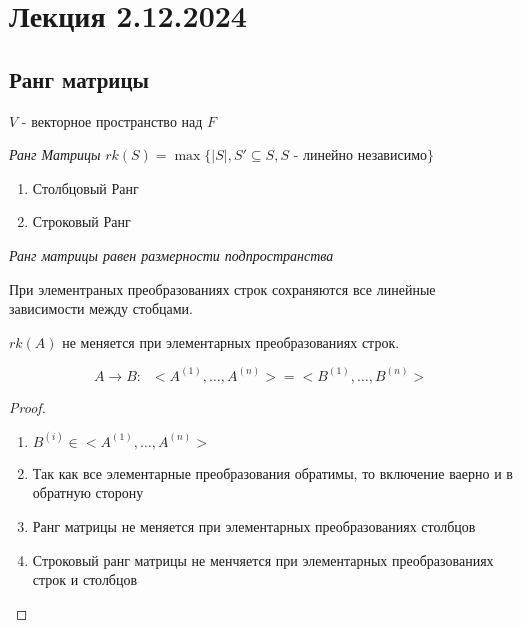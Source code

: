 \section{Лекция 2.12.2024}


\subsection{Ранг матрицы}


$V$ - векторное пространство над $F$


\begin{definition}

    \textit{Ранг Матрицы} $rk(S) = \max\{|S|, S' \subseteq S, \text{$S$ - линейно независимо}\}$

    \begin{enumerate}
        \item Столбцовый Ранг
        \item Строковый Ранг
    \end{enumerate}

\end{definition}


\begin{proposition}

    \textit{Ранг матрицы равен размерности подпространства}

\end{proposition}


\begin{lemma}

    При элементраных преобразованиях строк сохраняются все линейные зависимости между стобцами.

    $rk(A)$ не меняется при элементарных преобразованиях строк.

    $$A \rightarrow B: \;\; <A^{(1)}, \dots, A^{(n)}> = <B^{(1)}, \dots, B^{(n)}>$$

    \begin{proof}~

        \begin{enumerate}
            \item $B^{(i)} \in <A^{(1)}, \dots, A^{(n)}>$
            \item Так как все элементарные преобразования обратимы, то включение ваерно и в обратную сторону
            \item Ранг матрицы не меняется при элементарных преобразованиях столбцов 
            \item Строковый ранг матрицы не менчяется при элементарных преобразованиях строк и столбцов
        \end{enumerate}

    \end{proof}

\end{lemma}


